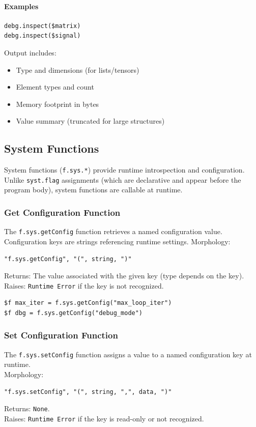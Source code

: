 \paragraph{Examples}
\begin{verbatim}
debg.inspect($matrix)
debg.inspect($signal)
\end{verbatim}

Output includes:
\begin{itemize}
\item Type and dimensions (for lists/tensors)
\item Element types and count
\item Memory footprint in bytes
\item Value summary (truncated for large structures)
\end{itemize}

\subsection{System Functions}

System functions (\texttt{f.sys.*}) provide runtime introspection and configuration. Unlike \texttt{syst.flag} assignments (which are declarative and appear before the program body), system functions are callable at runtime.

\subsubsection{Get Configuration Function}
The \texttt{f.sys.getConfig} function retrieves a named configuration value. Configuration keys are strings referencing runtime settings.
Morphology:
\begin{verbatim}
"f.sys.getConfig", "(", string, ")"
\end{verbatim}
Returns: The value associated with the given key (type depends on the key). \\

Raises: \texttt{Runtime Error} if the key is not recognized. \\

\begin{verbatim}
$f max_iter = f.sys.getConfig("max_loop_iter")
$f dbg = f.sys.getConfig("debug_mode")
\end{verbatim}

\subsubsection{Set Configuration Function}
The \texttt{f.sys.setConfig} function assigns a value to a named configuration key at runtime.
\\ Morphology:
\begin{verbatim}
"f.sys.setConfig", "(", string, ",", data, ")"
\end{verbatim}
Returns: \texttt{None}. \\
Raises: \texttt{Runtime Error} if the key is read-only or not recognized.

